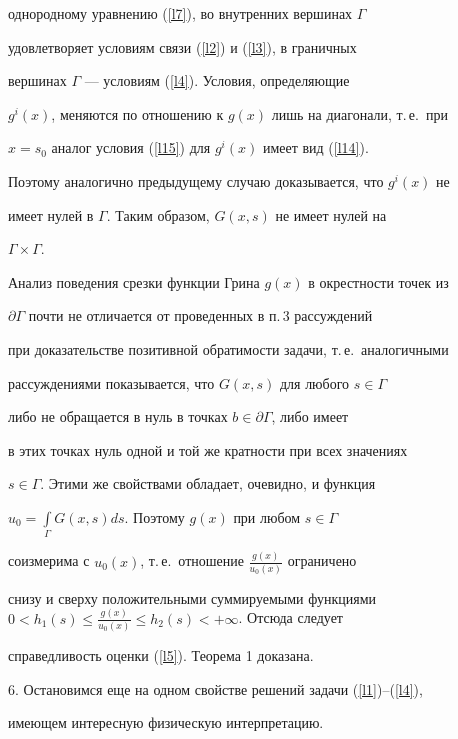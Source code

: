 {{{{{{{однородному уравнению (\ref{l7}), во внутренних вершинах $\Gamma$


удовлетворяет условиям связи (\ref{l2}) и (\ref{l3}), в граничных


вершинах $\Gamma$ --- условиям (\ref{l4}). Условия, определяющие


$g^i(x)$, меняются по отношению к $g(x)$ лишь на диагонали, т.\,е.~при


$x=s_0$ аналог условия (\ref{l15}) для $g^i(x)$ имеет вид (\ref{l14}).


Поэтому аналогично предыдущему случаю доказывается, что $g^i(x)$ не


имеет нулей в $\Gamma$. Таким образом, $G(x,s)$ не имеет нулей на


$\Gamma\times \Gamma$.





Анализ поведения срезки функции Грина $g(x)$ в окрестности точек из


$\partial \Gamma$ почти не отличается от проведенных в п.\,3 рассуждений


при доказательстве позитивной обратимости задачи, т.\,е.~аналогичными


рассуждениями показывается, что $G(x,s)$ для любого $s \in \Gamma$


либо не обращается в нуль в точках $b \in \partial \Gamma$, либо имеет


в этих точках нуль одной и той же кратности при всех значениях


$s \in \Gamma$. Этими же свойствами обладает, очевидно, и функция


$u_0=\int\limits_{\Gamma}G(x,s)ds$. Поэтому $g(x)$ при любом $s \in \Gamma$


соизмерима с $u_0(x)$, т.\,е.~отношение $\frac{g(x)}{u_0(x)}$ ограничено


снизу и сверху положительными суммируемыми функциями $0<h_1(s)\leq


\frac{g(x)}{u_0(x)} \leq h_2(s)< +\infty$. Отсюда следует


справедливость оценки (\ref{l5}). Теорема 1 доказана.


\medskip





6. Остановимся еще на одном свойстве решений задачи (\ref{l1})--(\ref{l4}),


имеющем интересную физическую интерпретацию.





}}}}}}}

